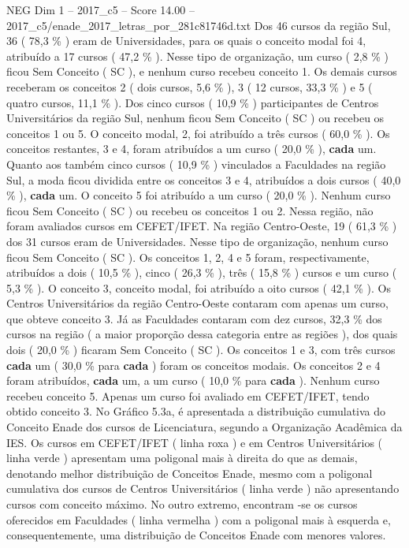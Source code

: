 \begin{textsample}{NEG Dim 1 – 2017\_c5 – Score 14.00 – 2017\_c5/enade\_2017\_letras\_por\_281c81746d.txt}
Dos 46 cursos da região Sul, 36 ( 78,3 \% ) eram de Universidades, para os quais o conceito modal foi 4, atribuído a 17 cursos ( 47,2 \% ).
Nesse tipo de organização, um curso ( 2,8 \% ) ficou Sem Conceito ( SC ), e nenhum curso recebeu conceito 1.
Os demais cursos receberam os conceitos 2 ( dois cursos, 5,6 \% ), 3 ( 12 cursos, 33,3 \% ) e 5 ( quatro cursos, 11,1 \% ).
Dos cinco cursos ( 10,9 \% ) participantes de Centros Universitários da região Sul, nenhum ficou Sem Conceito ( SC ) ou recebeu os conceitos 1 ou 5.
O conceito modal, 2, foi atribuído a três cursos ( 60,0 \% ).
Os conceitos restantes, 3 e 4, foram atribuídos a um curso ( 20,0 \% ), \textbf{cada} um.
Quanto aos também cinco cursos ( 10,9 \% ) vinculados a Faculdades na região Sul, a moda ficou dividida entre os conceitos 3 e 4, atribuídos a dois cursos ( 40,0 \% ), \textbf{cada} um.
O conceito 5 foi atribuído a um curso ( 20,0 \% ).
Nenhum curso ficou Sem Conceito ( SC ) ou recebeu os conceitos 1 ou 2.
Nessa região, não foram avaliados cursos em CEFET/IFET.
Na região Centro-Oeste, 19 ( 61,3 \% ) dos 31 cursos eram de Universidades.
Nesse tipo de organização, nenhum curso ficou Sem Conceito ( SC ).
Os conceitos 1, 2, 4 e 5 foram, respectivamente, atribuídos a dois ( 10,5 \% ), cinco ( 26,3 \% ), três ( 15,8 \% ) cursos e um curso ( 5,3 \% ).
O conceito 3, conceito modal, foi atribuído a oito cursos ( 42,1 \% ).
Os Centros Universitários da região Centro-Oeste contaram com apenas um curso, que obteve conceito 3.
Já as Faculdades contaram com dez cursos, 32,3 \% dos cursos na região ( a maior proporção dessa categoria entre as regiões ), dos quais dois ( 20,0 \% ) ficaram Sem Conceito ( SC ).
Os conceitos 1 e 3, com três cursos \textbf{cada} um ( 30,0 \% para \textbf{cada} ) foram os conceitos modais.
Os conceitos 2 e 4 foram atribuídos, \textbf{cada} um, a um curso ( 10,0 \% para \textbf{cada} ).
Nenhum curso recebeu conceito 5.
Apenas um curso foi avaliado em CEFET/IFET, tendo obtido conceito 3.
No Gráfico 5.3a, é apresentada a distribuição cumulativa do Conceito Enade dos cursos de Licenciatura, segundo a Organização Acadêmica da IES.
Os cursos em CEFET/IFET ( linha roxa ) e em Centros Universitários ( linha verde ) apresentam uma poligonal mais à direita do que as demais, denotando melhor distribuição de Conceitos Enade, mesmo com a poligonal cumulativa dos cursos de Centros Universitários ( linha verde ) não apresentando cursos com conceito máximo.
No outro extremo, encontram -se os cursos oferecidos em Faculdades ( linha vermelha ) com a poligonal mais à esquerda e, consequentemente, uma distribuição de Conceitos Enade com menores valores.

\end{textsample}
